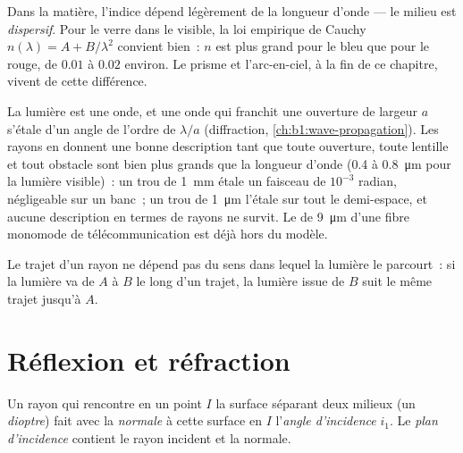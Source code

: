\begin{remark}[Dispersion]\label{rem:b1:rays-reflection-refraction:dispersion}
Dans la matière, l'indice dépend légèrement de la longueur d'onde --- le
milieu est \emph{dispersif}. Pour le verre dans le visible, la loi
empirique de Cauchy $n(\lambda) = A + B/\lambda^2$ convient bien~: $n$
est plus grand pour le bleu que pour le rouge, de $0.01$ à $0.02$
environ. Le prisme et l'arc-en-ciel, à la fin de ce chapitre, vivent de
cette différence.
\end{remark}

\begin{remark}\label{rem:b1:rays-reflection-refraction:limits}
La lumière est une onde, et une onde qui franchit une ouverture de
largeur $a$ s'étale d'un angle de l'ordre de $\lambda/a$ (diffraction,
\cref{ch:b1:wave-propagation}). Les rayons en donnent une bonne
description tant que toute ouverture, toute lentille et tout obstacle
sont bien plus grands que la longueur d'onde (\qty{0.4}{} à
\qty{0.8}{\micro m} pour la lumière visible)~: un trou de \qty{1}{mm}
étale un faisceau de $10^{-3}$ radian, négligeable sur un banc~; un trou
de \qty{1}{\micro m} l'étale sur tout le demi-espace, et aucune
description en termes de rayons ne survit. Le  de \qty{9}{\micro m}
d'une fibre monomode de télécommunication est déjà hors du modèle.
\end{remark}

\begin{proposition}\label{prop:b1:rays-reflection-refraction:reversibility}
Le trajet d'un rayon ne dépend pas du sens dans lequel la lumière le
parcourt~: si la lumière va de $A$ à $B$ le long d'un trajet, la lumière
issue de $B$ suit le même trajet jusqu'à $A$.
\end{proposition}
\admitted

\section{Réflexion et réfraction}

\begin{definition}[Incidence]\label{def:b1:rays-reflection-refraction:incidence}
Un rayon qui rencontre en un point $I$ la surface séparant deux milieux
(un \emph{dioptre}) fait avec la \emph{normale} à cette surface en $I$
l'\emph{angle d'incidence} $i_1$. Le \emph{plan d'incidence} contient le
rayon incident et la normale.
\end{definition}

